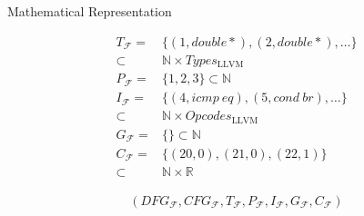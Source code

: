\begin{blackbox}{Mathematical Representation}
\begin{minipage}{0.329\textwidth}
\begin{graybox}
            \vspace{4.36em}
        \end{graybox}
    \end{minipage}
    \begin{minipage}{0.329\textwidth}
        \centering
        \begin{graybox}
            \scriptsize
            \setlength{\abovedisplayskip}{0pt}
            \setlength{\belowdisplayskip}{0pt}
            \vspace{-0.5em}
            \begin{align*}
                T_\mathcal F={}&\{(1,double*),(2,double*),\dots\}\\[-0.5em]
                      \subset{}&\mathbb N\times Types_\text{LLVM}\\[-0.25em]
                P_\mathcal F={}&\{1,2,3\}\subset\mathbb N\\[-0.25em]
                I_\mathcal F={}&\{(4,icmp\ eq),(5,cond\ br),\dots\}\\[-0.5em]
                      \subset{}&\mathbb N\times Opcodes_\text{LLVM}\\[-0.25em]
                G_\mathcal F={}&\{\}\subset\mathbb N\\[-0.25em]
                C_\mathcal F={}&\{(20,0),(21,0),(22,1)\}\\[-0.5em]
                      \subset{}&\mathbb N\times\mathbb R
            \end{align*}

            \vspace{0.45em}
        \end{graybox}
    \end{minipage}

    \begin{minipage}{14.4cm}
        \begin{graybox}
            \setlength{\abovedisplayskip}{0pt}
            \setlength{\belowdisplayskip}{0pt}
            \vspace{-0.5em}
            \begin{align*}
                (DFG_\mathcal{F},
                 CFG_\mathcal{F},
                 T_\mathcal{F},
                 P_\mathcal{F},
                 I_\mathcal{F},
                 G_\mathcal{F},
                 C_\mathcal{F})
            \end{align*}
        \end{graybox}
    \end{minipage}
\end{blackbox}